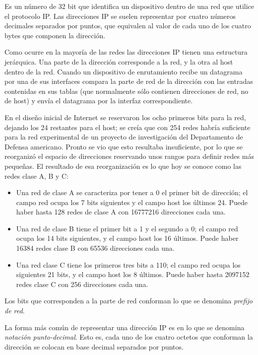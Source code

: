 Es un número de 32 bit que identifica un dispositivo dentro de una red que utilice el protocolo IP. Las direcciones IP se suelen representar por cuatro números decimales separados por puntos, que equivalen al valor de cada uno de los cuatro bytes que componen la dirección.

Como ocurre en la mayoría de las redes las direcciones IP tienen una estructura jerárquica. Una parte de la dirección corresponde a la red, y la otra al host dentro de la red. Cuando un dispositivo de enrutamiento recibe un datagrama por una de sus interfaces compara la parte de red de la dirección con las entradas contenidas en sus tablas (que normalmente sólo contienen direcciones de red, no de host) y envía el datagrama por la interfaz correspondiente.
 
En el diseño inicial de Internet se reservaron los ocho primeros bits para la red, dejando los 24 restantes para el host; se creía que con 254 redes habría suficiente para la red experimental de un proyecto de investigación del Departamento de Defensa americano. Pronto se vio que esto resultaba insuficiente, por lo que se reorganizó el espacio de direcciones reservando unos rangos para definir redes más pequeñas. El resultado de esa reorganización es lo que hoy se conoce como las redes clase A, B y C:

\begin{itemize}
	\item Una red de clase A se caracteriza por tener a 0 el primer bit de dirección; el campo red ocupa los 7 bits siguientes y el campo host los últimos 24. Puede haber hasta 128 redes de clase A con 16777216 direcciones cada una.

	\item Una red de clase B tiene el primer bit a 1 y el segundo a 0; el campo red ocupa los 14 bits  siguientes, y el campo host los 16 últimos. Puede haber 16384 redes clase B con 65536  direcciones cada una.
	
	\item Una red clase C tiene los primeros tres bits a 110; el campo red ocupa los siguientes 21 bits, y el  campo host los 8 últimos. Puede haber hasta 2097152 redes clase C con 256 direcciones cada una.
\end{itemize}

Los bits que corresponden a la parte de red conforman lo que se denomina \textit{prefijo de red}. 

La forma más común de representar una dirección IP es en lo que se denomina \textit{notación punto-decimal}. Esto es, cada uno de los cuatro octetos que conforman la dirección se colocan en base decimal separados por puntos.

